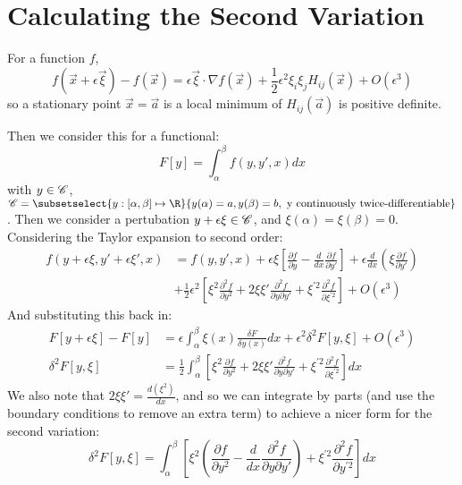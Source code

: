 \documentclass[../Main.tex]{subfiles}
\begin{document}
\section{Calculating the Second Variation}
For a function $f$,
\begin{equation*}
    f(\vec{x} + \epsilon \vec{\xi}) - f(\vec{x}) = \epsilon \vec{\xi} \cdot \nabla f(\vec{x}) + \frac{1}{2} \epsilon^2 \xi_i \xi_j H_{ij}(\vec{x}) + O(\epsilon^3)
\end{equation*}
so a stationary point $\vec{x} = \vec{a}$ is a local minimum of $H_{ij}(\vec{a})$ is positive definite.

Then we consider this for a functional:
\begin{equation*}
    F[y] = \int_\alpha^\beta f(y, y', x) dx
\end{equation*}
with $y \in \mathscr{C}$, $\funcset = \subsetselect{y : [\alpha, \beta] \mapsto \R}{y(\alpha) = a, y(\beta) = b, \text{ y continuously twice-differentiable}}$.
Then we consider a pertubation $y + \epsilon \xi \in \mathscr{C}$, and $\xi(\alpha) = \xi(\beta) = 0$.
Considering the Taylor expansion to second order:
\begin{align*}
    f(y + \epsilon \xi, y' + \epsilon \xi', x) &= f(y, y', x) + \epsilon \xi \left[\frac{\partial f}{\partial y} - \frac{d}{dx} \frac{\partial f}{\partial y'}\right] + \epsilon \frac{d}{dx}\left(\xi \frac{\partial f}{\partial y'}\right) \\
    &+ \frac{1}{2} \epsilon^2 \left[\xi^2 \frac{\partial^2 f}{\partial y^2} + 2\xi \xi' \frac{\partial^2 f}{\partial y \partial y'} + \xi^{\prime 2} \frac{\partial^2 f}{\partial \xi^{\prime 2}}\right] + O(\epsilon^3)
\end{align*}
And substituting this back in:
\begin{align*}
    F[y + \epsilon \xi] - F[y] &= \epsilon \int_\alpha^\beta \xi(x) \frac{\delta F}{\delta y(x)}dx + \epsilon^2 \delta^2 F[y, \xi] + O(\epsilon^3) \\
    \delta^2 F[y, \xi] &= \frac{1}{2} \int_\alpha^\beta \left[\xi^2 \frac{\partial f}{\partial y^2} + 2\xi\xi' \frac{\partial^2 f}{\partial y \partial y'} + \xi^{\prime 2} \frac{\partial^2 f}{\partial \xi^{\prime 2}}\right]dx
\end{align*}
We also note that $2\xi\xi' = \frac{d(\xi^2)}{dx}$, and so we can integrate by parts (and use the boundary conditions to remove an extra term) to achieve a nicer form for the second variation:
\begin{equation}
    \delta^2 F[y, \xi] = \int_\alpha^\beta \left[\xi^2 \left(\frac{\partial f}{\partial y^2} - \frac{d}{dx} \frac{\partial^2 f}{\partial y \partial y'}\right) + \xi^{\prime 2} \frac{\partial^2 f}{\partial y^{\prime 2}}\right]dx
    \label{eqnSecondVariation}
\end{equation}
\end{document}
